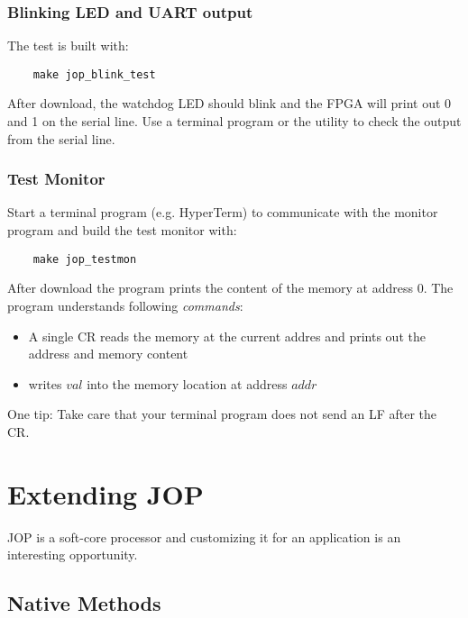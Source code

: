 \subsubsection{Blinking LED and UART output}

The test is built with:
%
\begin{lstlisting}
    make jop_blink_test
\end{lstlisting}
%
After download, the watchdog LED should blink and the FPGA will print
out 0 and 1 on the serial line. Use a terminal program or the utility
 to check the output from the serial line.

\subsubsection{Test Monitor}

Start a terminal program (e.g. HyperTerm) to communicate with the
monitor program and build the test monitor with:
%
\begin{lstlisting}
    make jop_testmon
\end{lstlisting}
%
After download the program prints the content of the memory at
address 0. The program understands following \emph{commands}:

\begin{itemize}
    \item A single CR reads the memory at the current addres
    and prints out the address and memory content
    \item {} writes $val$ into the memory location at
    address $addr$
\end{itemize}

One tip: Take care that your terminal program does not send an LF
after the CR.


\section{Extending JOP}


JOP is a soft-core processor and customizing it for an application
is an interesting opportunity.

\subsection{Native Methods}


